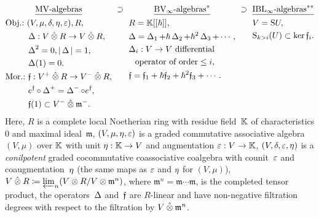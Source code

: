 \documentclass[\MainFolder/Text.tex]{subfiles}
\begin{document}
\begin{equation}\label{Eq:InclOfCat}
\begin{gathered}[t]
\underline{\MV\text{-algebras}} \\
\begin{aligned}
&\text{Obj.:}\ \begin{aligned}[t]
&(V,\MVProd,\MVCoProd,\MVUnit,\MVAug), R, \\
&\BVOp : V\COtimes R \rightarrow V\COtimes R,\\
& \BVOp^2 = 0, \Abs{\BVOp}=1, \\
& \BVOp(1) = 0.
\end{aligned}\\
&\text{Mor.:}\ \begin{aligned}[t]
&\MVMorF: V^+\COtimes R\rightarrow V^-\COtimes R, \\
&e^\MVMorF \circ \BVOp^+ = \BVOp^- \circ e^\MVMorF,  \\
&\MVMorF(1) \subset V^-\COtimes\mathfrak{m}^-.
\end{aligned}
\end{aligned}
\end{gathered}
\ \supset\ 
\begin{gathered}[t]
\underline{\text{$\BVInfty$\text{-algebras}}^{*}} \\
\begin{aligned}[t]
&R = \K[[\hbar]], \\
&\Delta= \BVOp_1 + \hbar \BVOp_2 + \hbar^2 \BVOp_3 + \dotsb, \\
& \begin{aligned}[t]\Delta_i: V \rightarrow V \text{ differential}\\\text{operator of order}\le i, \end{aligned}\\
&\MVMorF= \MVMorF_1 + \hbar \MVMorF_2 + \hbar^2 \MVMorF_3 + \dotsb.
\end{aligned}
\end{gathered}
\ \supset\ 
\begin{gathered}[t]
\underline{\text{$\IBLInfty$\text{-algebras}}^{**}} \\
\begin{aligned}
&V = \Sym U,  \\
&\Sym_{k > i}(U) \subset \ker \MVMorF_i.
\end{aligned}
\end{gathered}
\end{equation}
Here, $R$ is a complete local Noetherian ring with residue field~$\mathbb{K}$ of characteristics $0$ and maximal ideal~$\mathfrak{m}$, $(V,\mu,\eta,\varepsilon)$ is a graded commutative associative algebra $(V,\mu)$ over $\mathbb{K}$ with unit $\eta: \mathbb{K} \rightarrow V$ and augmentation $\varepsilon: V\rightarrow\mathbb{K}$, $(V,\delta,\varepsilon,\eta)$ is a \emph{conilpotent} graded cocommutative coassociative coalgebra with counit~$\varepsilon$ and coaugmentation~$\eta$ (the same maps as $\varepsilon$ and $\eta$ for $(V,\mu)$), $V\COtimes R \coloneqq \varprojlim_n (V\otimes R/V\otimes \mathfrak{m}^n)$, where $\mathfrak{m}^n = \mathfrak{m}\dotsb\mathfrak{m}$, is the completed tensor product, the operators~$\operatorname{\Delta}$ and~$\mathfrak{f}$ are $R$-linear and have non-negative filtration degrees with respect to the filtration by $V\COtimes \mathfrak{m}^n$.
\end{document}
